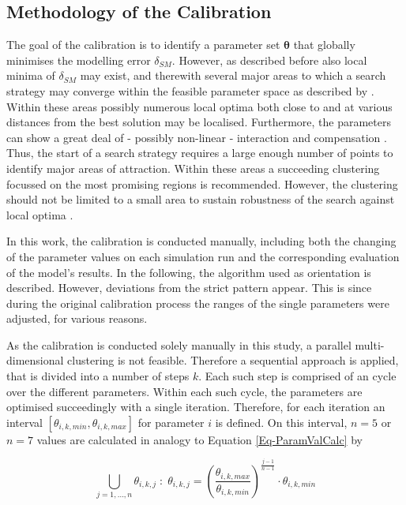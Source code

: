 \subsection{Methodology of the Calibration}
\label{Sec-SubMethCal}

The goal of the calibration is to identify a parameter set $\bm{\theta}$ that globally minimises the modelling error $\delta_{SM}$. 
However, as described before also local minima of $\delta_{SM}$ may exist, and therewith several major areas to which a search strategy may converge within the feasible parameter space as described by \textcite{Duan.1993}. 
Within these areas possibly numerous local optima both close to and at various distances from the best solution may be localised. 
Furthermore, the parameters can show a great deal of - possibly non-linear - interaction and compensation \parencite{Duan.1993}. 
Thus, the start of a search strategy requires a large enough number of points to identify major areas of attraction. 
Within these areas a succeeding clustering focussed on the most promising regions is recommended. 
However, the clustering should not be limited to a small area to sustain robustness of the search against local optima \parencite{Duan.1993}.

In this work, the calibration is conducted manually, including both the changing of the parameter values on each simulation run and the corresponding evaluation of the model's results. 
In the following, the algorithm used as orientation is described. 
However, deviations from the strict pattern appear. 
This is since during the original calibration process the ranges of the single parameters were adjusted, for various reasons.

As the calibration is conducted solely manually in this study, a parallel multi-dimensional clustering is not feasible. 
Therefore a sequential approach is applied, that is divided into a number of steps $k$. 
Each such step is comprised of an cycle over the different parameters. 
Within each such cycle, the parameters are optimised succeedingly with a single iteration. 
Therefore, for each iteration an interval $[\theta_{i,k,min}, \theta_{i,k,max}]$ for parameter $i$ is defined. 
On this interval, $n=5$ or $n=7$ values are calculated in analogy to Equation \eqref{Eq-ParamValCalc} by

\begin{equation}
    \label{Eq-ParamValCalcCalib}
    \bigcup_{j=1,...,n} \theta_{i,k,j} \; : \; \theta_{i,k,j} = \left( \frac{\theta_{i,k,max}}{\theta_{i,k,min}} \right) ^{\frac{j-1}{n-1}} \cdot \theta_{i,k,min}
\end{equation}

